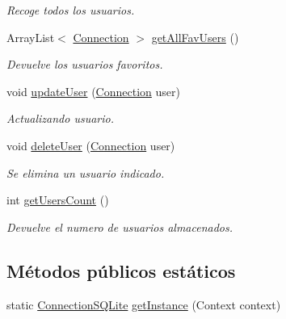 \begin{DoxyCompactItemize}
\begin{DoxyCompactList}\small\item\em Recoge todos los usuarios. \end{DoxyCompactList}\item 
Array\-List$<$ \hyperlink{classes_1_1ucm_1_1tfg_1_1controlremotolinux_1_1client_1_1model_1_1sql_1_1Connection}{Connection} $>$ \hyperlink{classes_1_1ucm_1_1tfg_1_1controlremotolinux_1_1client_1_1model_1_1sql_1_1ConnectionSQLite_a2611c0b327d1ca6279127c210440ee24}{get\-All\-Fav\-Users} ()
\begin{DoxyCompactList}\small\item\em Devuelve los usuarios favoritos. \end{DoxyCompactList}\item 
void \hyperlink{classes_1_1ucm_1_1tfg_1_1controlremotolinux_1_1client_1_1model_1_1sql_1_1ConnectionSQLite_a756eae0f887cc60d242c1701f6a1af14}{update\-User} (\hyperlink{classes_1_1ucm_1_1tfg_1_1controlremotolinux_1_1client_1_1model_1_1sql_1_1Connection}{Connection} user)
\begin{DoxyCompactList}\small\item\em Actualizando usuario. \end{DoxyCompactList}\item 
void \hyperlink{classes_1_1ucm_1_1tfg_1_1controlremotolinux_1_1client_1_1model_1_1sql_1_1ConnectionSQLite_a6e31796809638ebc2b8eb8c440c75407}{delete\-User} (\hyperlink{classes_1_1ucm_1_1tfg_1_1controlremotolinux_1_1client_1_1model_1_1sql_1_1Connection}{Connection} user)
\begin{DoxyCompactList}\small\item\em Se elimina un usuario indicado. \end{DoxyCompactList}\item 
int \hyperlink{classes_1_1ucm_1_1tfg_1_1controlremotolinux_1_1client_1_1model_1_1sql_1_1ConnectionSQLite_a91970e990ee7f46338dea5d0bebb0bec}{get\-Users\-Count} ()
\begin{DoxyCompactList}\small\item\em Devuelve el numero de usuarios almacenados. \end{DoxyCompactList}\end{DoxyCompactItemize}
\subsection*{Métodos públicos estáticos}
\begin{DoxyCompactItemize}
\item 
static \hyperlink{classes_1_1ucm_1_1tfg_1_1controlremotolinux_1_1client_1_1model_1_1sql_1_1ConnectionSQLite}{Connection\-S\-Q\-Lite} \hyperlink{classes_1_1ucm_1_1tfg_1_1controlremotolinux_1_1client_1_1model_1_1sql_1_1ConnectionSQLite_a0f82a8e698f6666f8fccedca93bafcc9}{get\-Instance} (Context context)
\end{DoxyCompactItemize}
